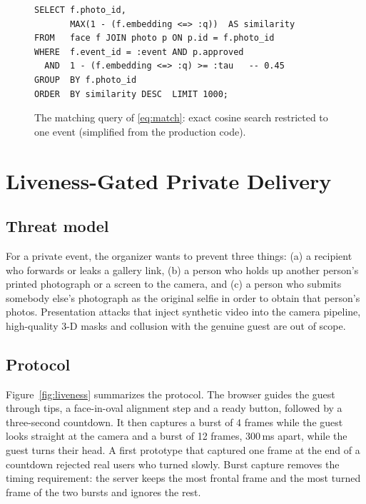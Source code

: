 \documentclass[conference]{IEEEtran}
\begin{document}
\begin{figure}[!t]
\centering
\scriptsize
\begin{minipage}{0.99\columnwidth}
\begin{verbatim}
SELECT f.photo_id,
       MAX(1 - (f.embedding <=> :q))  AS similarity
FROM   face f JOIN photo p ON p.id = f.photo_id
WHERE  f.event_id = :event AND p.approved
  AND  1 - (f.embedding <=> :q) >= :tau   -- 0.45
GROUP  BY f.photo_id
ORDER  BY similarity DESC  LIMIT 1000;
\end{verbatim}
\end{minipage}
\caption{The matching query of \eqref{eq:match}: exact cosine search restricted to one event (simplified from the production code).}
\label{fig:sql}
\end{figure}


\section{Liveness-Gated Private Delivery}\label{sec:liveness}
\subsection{Threat model}
For a private event, the organizer wants to prevent three things: (a) a recipient who forwards or leaks a gallery link, (b) a person who holds up another person's printed photograph or a screen to the camera, and (c) a person who submits somebody else's photograph as the original selfie in order to obtain that person's photos. Presentation attacks that inject synthetic video into the camera pipeline, high-quality 3-D masks and collusion with the genuine guest are out of scope.

\subsection{Protocol}
Figure~\ref{fig:liveness} summarizes the protocol. The browser guides the guest through tips, a face-in-oval alignment step and a ready button, followed by a three-second countdown. It then captures a burst of 4 frames while the guest looks straight at the camera and a burst of 12 frames, 300\,ms apart, while the guest turns their head. A first prototype that captured one frame at the end of a countdown rejected real users who turned slowly. Burst capture removes the timing requirement: the server keeps the most frontal frame and the most turned frame of the two bursts and ignores the rest.
\end{document}
